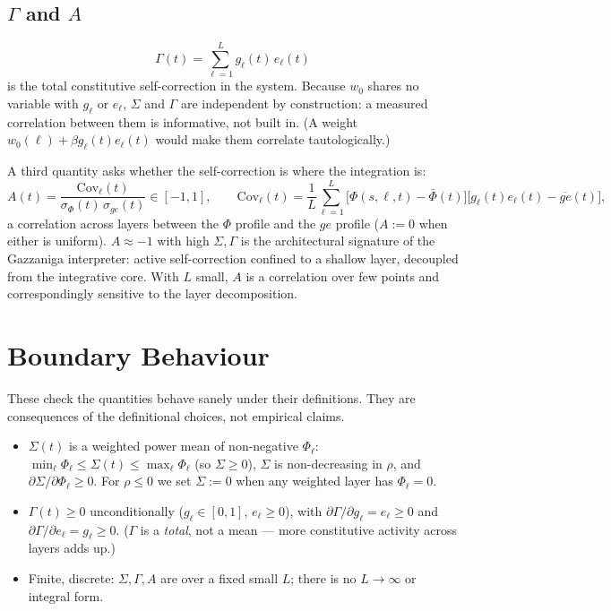 \documentclass[11pt]{article}
\begin{document}
\subsection{$\Gamma$ and $A$}
\[
\Gamma(t) = \sum_{\ell=1}^{L} g_\ell(t)\,e_\ell(t)
\]
is the total constitutive self-correction in the system. Because $w_0$ shares no variable with $g_\ell$ or $e_\ell$, $\Sigma$ and $\Gamma$ are independent by construction: a measured correlation between them is informative, not built in. (A weight $w_0(\ell)+\beta g_\ell(t)e_\ell(t)$ would make them correlate tautologically.)

A third quantity asks whether the self-correction is where the integration is:
\[
A(t) = \frac{\mathrm{Cov}_\ell(t)}{\sigma_\Phi(t)\,\sigma_{ge}(t)} \in [-1,1], \qquad
\mathrm{Cov}_\ell(t) = \frac{1}{L}\sum_{\ell=1}^{L}\big[\Phi(s,\ell,t)-\bar\Phi(t)\big]\big[g_\ell(t)e_\ell(t)-\overline{ge}(t)\big],
\]
a correlation across layers between the $\Phi$ profile and the $ge$ profile ($A:=0$ when either is uniform). $A\approx-1$ with high $\Sigma,\Gamma$ is the architectural signature of the Gazzaniga interpreter: active self-correction confined to a shallow layer, decoupled from the integrative core. With $L$ small, $A$ is a correlation over few points and correspondingly sensitive to the layer decomposition.

\section{Boundary Behaviour}\label{sec:bounds}

These check the quantities behave sanely under their definitions. They are consequences of the definitional choices, not empirical claims.

\begin{itemize}[leftmargin=*]
\item $\Sigma(t)$ is a weighted power mean of non-negative $\Phi_\ell$: $\min_\ell\Phi_\ell \le \Sigma(t) \le \max_\ell\Phi_\ell$ (so $\Sigma\ge0$), $\Sigma$ is non-decreasing in $\rho$, and $\partial\Sigma/\partial\Phi_\ell\ge0$. For $\rho\le0$ we set $\Sigma:=0$ when any weighted layer has $\Phi_\ell=0$.
\item $\Gamma(t)\ge0$ unconditionally ($g_\ell\in[0,1]$, $e_\ell\ge0$), with $\partial\Gamma/\partial g_\ell = e_\ell\ge0$ and $\partial\Gamma/\partial e_\ell = g_\ell\ge0$. ($\Gamma$ is a \emph{total}, not a mean --- more constitutive activity across layers adds up.)
\item Finite, discrete: $\Sigma,\Gamma,A$ are over a fixed small $L$; there is no $L\to\infty$ or integral form.
\end{itemize}
\end{document}
